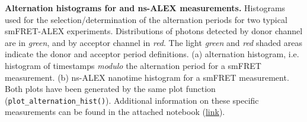 \label{fig:altern_hist_double} \textbf{Alternation histograms for \usalex and ns-ALEX measurements.} 
Histograms used for the selection/determination 
of the alternation periods for two typical smFRET-ALEX experiments.
Distributions of photons detected by donor channel are in \textit{green}, and by acceptor channel in \textit{red}.
The light \textit{green} and \textit{red} shaded areas indicate the donor and acceptor period definitions.
(a) \usalex alternation histogram, i.e. histogram of timestamps \textit{modulo} the alternation period for a smFRET measurement. 
(b) ns-ALEX nanotime histogram for a smFRET measurement. 
Both plots have been generated by the same plot function (\texttt{plot\_alternation\_hist()}). 
Additional information on these specific measurements can be found in the attached notebook 
(\href{http://nbviewer.jupyter.org/github/tritemio/fretbursts_paper/blob/master/notebooks/Figures%20-%20ALEX%20histograms.ipynb}{link}).
